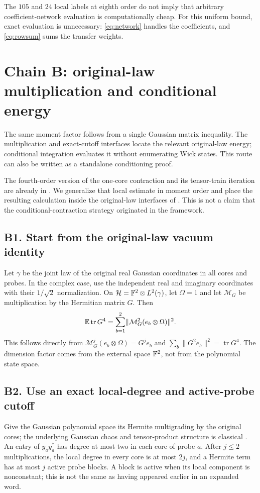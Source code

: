 \documentclass[11pt]{article}
\numberwithin{equation}{section}
\theoremstyle{definition}\newtheorem{definition}[theorem]{Definition}
\theoremstyle{remark}\newtheorem{remark}[theorem]{Remark}
\newcommand{\tr}{\operatorname{tr}}\newcommand{\Ent}{\operatorname{Ent}}
\newcommand{\norm}[1]{\lVert#1\rVert}\newcommand{\ip}[2]{\langle#1,#2\rangle}
\begin{document}
The $105$ and $24$ local labels at eighth order do not imply that arbitrary
coefficient-network evaluation is computationally cheap. For this uniform
bound, exact evaluation is unnecessary: \eqref{eq:network} handles the
coefficients, and \eqref{eq:rowsum} sums the transfer weights.

\par{}
\section{Chain B: original-law multiplication and conditional energy}\label{sec:B}
\begin{takeaway}
The same moment factor follows from a single Gaussian matrix inequality.
The multiplication and exact-cutoff interfaces locate the relevant original-law
energy; conditional integration evaluates it without enumerating Wick states.
This route can also be written as a standalone conditioning proof.
\end{takeaway}

The fourth-order version of the one-core contraction and its tensor-train
iteration are already in \cite[Section~5.1, Lemmas~3--4]{RR2020}. We generalize
that local estimate in moment order and place the resulting calculation inside
the original-law interfaces of \cite{Framework}. This is not a claim that the
conditional-contraction strategy originated in the framework.

\subsection{B1. Start from the original-law vacuum identity}
Let $\gamma$ be the joint law of the original real Gaussian coordinates in
all cores and probes. In the complex case, use the independent real and
imaginary coordinates with their $1/\sqrt2$ normalization.
On $\mathcal H=\mathbb F^2\otimes L^2(\gamma)$, let $\Omega=1$ and let
$\mathcal M_G$ be multiplication by the Hermitian matrix $G$. Then
\begin{equation}\label{eq:vacuum}
 \E\tr G^4=\sum_{b=1}^2\norm{\mathcal M_G^2(e_b\otimes\Omega)}^2.
\end{equation}
This follows directly from $\mathcal M_G^j(e_b\otimes\Omega)=G^je_b$ and
$\sum_b\norm{G^2e_b}^2=\tr G^4$. The dimension factor comes from the
external space $\mathbb F^2$, not from the polynomial state space.

\subsection{B2. Use an exact local-degree and active-probe cutoff}
Give the Gaussian polynomial space its Hermite multigrading by the original
cores; the underlying Gaussian chaos and tensor-product structure is classical
\cite[Chapters~2--4]{Janson}. An entry of $y_ay_a^*$ has degree at most two in each core of probe $a$.
After $j\le2$ multiplications, the local degree in every core is at most $2j$,
and a Hermite term has at most $j$ active probe blocks. A block is active when
its local component is nonconstant; this is not the same as having appeared
earlier in an expanded word.
\end{document}
